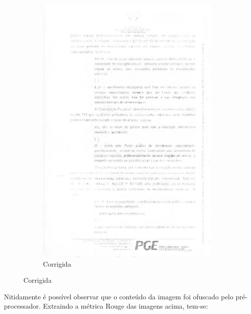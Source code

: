 \begin{figure}[H]
\begin{subfigure}[t]{0.3\linewidth}
    \includegraphics[width=\textwidth]{figuras/1004871_310554941_13_corrected.jpg}
    \caption{Corrigida}
  \end{subfigure}
  \label{fig:cycle-gan-first-test}
\end{figure}

Nitidamente é possível observar que o conteúdo da imagem foi ofuscado pelo pré-processador. Extraindo a métrica Rouge das imagens acima, tem-se:

